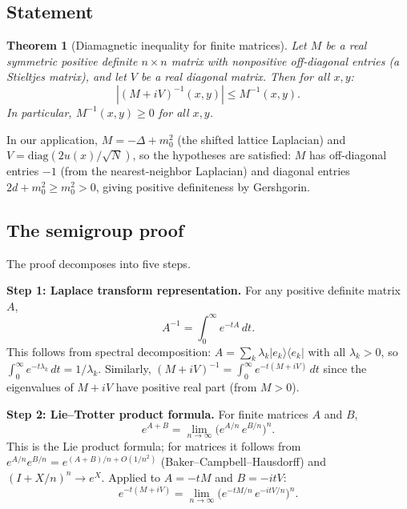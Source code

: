 \documentclass[12pt]{article}
\newtheorem{theorem}{Theorem}
\theoremstyle{definition}
\theoremstyle{remark}
\begin{document}
\subsection{Statement}

\begin{theorem}[Diamagnetic inequality for finite matrices]
\label{thm:diamagnetic}
Let $M$ be a real symmetric positive definite $n \times n$ matrix
with nonpositive off-diagonal entries (a Stieltjes matrix), and let
$V$ be a real diagonal matrix. Then for all $x, y$:
\begin{equation}\label{eq:diamagnetic}
  |(M + iV)^{-1}(x,y)| \le M^{-1}(x,y).
\end{equation}
In particular, $M^{-1}(x,y) \ge 0$ for all $x,y$.
\end{theorem}

In our application, $M = -\Delta + m_0^2$ (the shifted lattice
Laplacian) and $V = \mathrm{diag}(2u(x)/\sqrt{N})$, so the
hypotheses are satisfied: $M$ has off-diagonal entries $-1$ (from
the nearest-neighbor Laplacian) and diagonal entries $2d + m_0^2
\ge m_0^2 > 0$, giving positive definiteness by Gershgorin.

\subsection{The semigroup proof}

The proof decomposes into five steps.

\medskip\noindent\textbf{Step 1: Laplace transform representation.}
For any positive definite matrix~$A$,
\begin{equation}\label{eq:laplace-resolvent}
  A^{-1} = \int_0^\infty e^{-tA}\,dt.
\end{equation}
This follows from spectral decomposition: $A = \sum_k \lambda_k
|e_k\rangle\langle e_k|$ with all $\lambda_k > 0$, so
$\int_0^\infty e^{-t\lambda_k}\,dt = 1/\lambda_k$. Similarly,
$(M+iV)^{-1} = \int_0^\infty e^{-t(M+iV)}\,dt$ since the
eigenvalues of $M + iV$ have positive real part (from $M > 0$).

\medskip\noindent\textbf{Step 2: Lie--Trotter product formula.}
For finite matrices $A$ and $B$,
\begin{equation}\label{eq:trotter}
  e^{A+B} = \lim_{n\to\infty} \bigl(e^{A/n}\,e^{B/n}\bigr)^n.
\end{equation}
This is the Lie product formula; for matrices it follows from
$e^{A/n}e^{B/n} = e^{(A+B)/n + O(1/n^2)}$ (Baker--Campbell--Hausdorff)
and $(I + X/n)^n \to e^X$. Applied to $A = -tM$ and $B = -itV$:
\begin{equation}
  e^{-t(M+iV)} = \lim_{n\to\infty}
    \bigl(e^{-tM/n}\,e^{-itV/n}\bigr)^n.
\end{equation}
\end{document}
